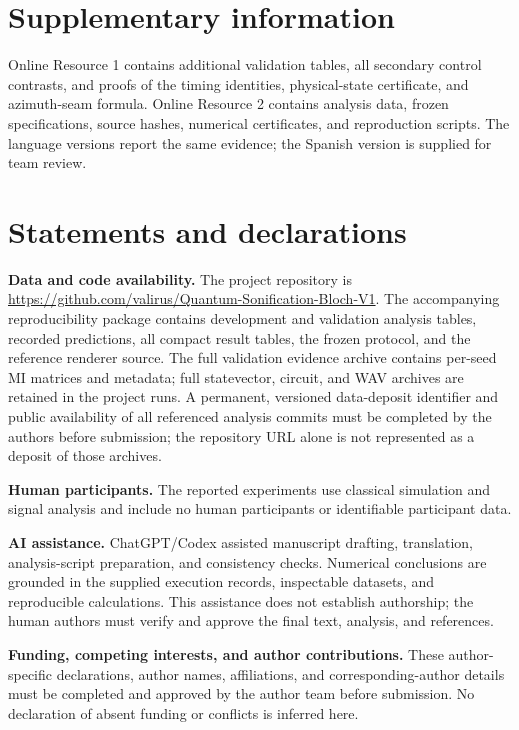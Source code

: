 \documentclass[pdflatex,iicol,sn-basic,Numbered]{sn-jnl}
\begin{document}
\backmatter
\section*{Supplementary information}
Online Resource 1 contains additional validation tables, all secondary control contrasts, and proofs of the timing identities, physical-state certificate, and azimuth-seam formula. Online Resource 2 contains analysis data, frozen specifications, source hashes, numerical certificates, and reproduction scripts. The language versions report the same evidence; the Spanish version is supplied for team review.

\section*{Statements and declarations}
\textbf{Data and code availability.} The project repository is \url{https://github.com/valirus/Quantum-Sonification-Bloch-V1}. The accompanying reproducibility package contains development and validation analysis tables, recorded predictions, all compact result tables, the frozen protocol, and the reference renderer source. The full validation evidence archive contains per-seed MI matrices and metadata; full statevector, circuit, and WAV archives are retained in the project runs. A permanent, versioned data-deposit identifier and public availability of all referenced analysis commits must be completed by the authors before submission; the repository URL alone is not represented as a deposit of those archives.

\textbf{Human participants.} The reported experiments use classical simulation and signal analysis and include no human participants or identifiable participant data.

\textbf{AI assistance.} ChatGPT/Codex assisted manuscript drafting, translation, analysis-script preparation, and consistency checks. Numerical conclusions are grounded in the supplied execution records, inspectable datasets, and reproducible calculations. This assistance does not establish authorship; the human authors must verify and approve the final text, analysis, and references.

\textbf{Funding, competing interests, and author contributions.} These author-specific declarations, author names, affiliations, and corresponding-author details must be completed and approved by the author team before submission. No declaration of absent funding or conflicts is inferred here.


\end{document}
